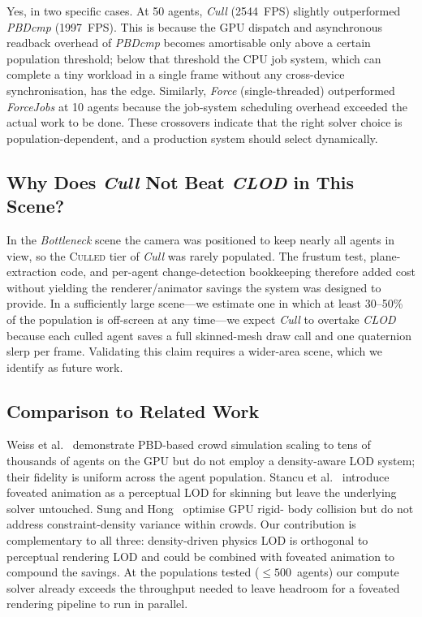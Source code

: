 Yes, in two specific cases.  At 50 agents, \textit{Cull} (2544~FPS)
slightly outperformed \textit{PBDcmp} (1997~FPS).  This is because the
GPU dispatch and asynchronous readback overhead of \textit{PBDcmp}
becomes amortisable only above a certain population threshold; below
that threshold the CPU job system, which can complete a tiny workload
in a single frame without any cross-device synchronisation, has the
edge.  Similarly, \textit{Force} (single-threaded) outperformed
\textit{ForceJobs} at 10 agents because the job-system scheduling
overhead exceeded the actual work to be done.  These crossovers
indicate that the right solver choice is population-dependent, and a
production system should select dynamically.

\subsection{Why Does \textit{Cull} Not Beat \textit{CLOD} in This Scene?}
\label{sec:eval_culling}

In the \textit{Bottleneck} scene the camera was positioned to keep
nearly all agents in view, so the \textsc{Culled} tier of \textit{Cull}
was rarely populated.  The frustum test, plane-extraction code, and
per-agent change-detection bookkeeping therefore added cost without
yielding the renderer/animator savings the system was designed to
provide.  In a sufficiently large scene---we estimate one in which at
least 30--50\% of the population is off-screen at any time---we expect
\textit{Cull} to overtake \textit{CLOD} because each culled agent saves
a full skinned-mesh draw call and one quaternion slerp per frame.
Validating this claim requires a wider-area scene, which we identify
as future work.

\subsection{Comparison to Related Work}

Weiss et al.~\cite{weiss2019} demonstrate PBD-based crowd simulation
scaling to tens of thousands of agents on the GPU but do not employ a
density-aware LOD system; their fidelity is uniform across the agent
population.  Stancu et al.~\cite{stancu} introduce foveated
animation as a perceptual LOD for skinning but leave the underlying
solver untouched.  Sung and Hong~\cite{sung} optimise GPU rigid-
body collision but do not address constraint-density variance within
crowds.  Our contribution is complementary to all three: density-driven
physics LOD is orthogonal to perceptual rendering LOD and could be
combined with foveated animation to compound the savings.  At the
populations tested ($\leq 500$~agents) our compute solver already
exceeds the throughput needed to leave headroom for a foveated
rendering pipeline to run in parallel.
